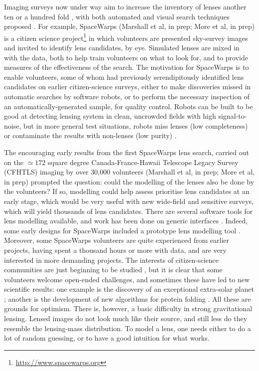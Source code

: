 \documentclass[usenatbib]{mn2e}
\newcommand{\sw}{SpaceWarps\xspace}
\begin{document}
Imaging surveys now under way aim to increase the inventory of lenses
another ten or a hundred fold \citep[see
e.g.][]{Marshall2005,OguriMarshall2010}, with both automated and
visual search techniques proposed
\citep[e.g.][]{Marshall2009,More2012ApJ,Gavazzi2014}. For example, \sw
(Marshall et al, in prep; More et al, in prep) is a citizen science
project\footnote{\url{http://www.spacewarps.org}} in which volunteers
are presented sky-survey images and invited to identify lens
candidates, by eye.  Simulated lenses are mixed in with the data,
both to help train volunteers on what to look for, and to provide
measures of the effectiveness of the search.  The motivation for \sw
is to enable volunteers, some of whom had previously serendipitously
identified lens candidates on earlier citizen-science surveys,
either to make discoveries missed in automatic searches by
software robots, or to perform the necessary inspection of an
automatically-generated sample, for quality control.  Robots can be
built to be good at detecting lensing system in clean, uncrowded fields
with high signal-to-noise, but in more general test situations, robots
miss lenses (low completeness) or contaminate the results with
non-lenses (low purity) \citep{Marshall2009}.

The encouraging early results from the first \sw lens search,
carried out on the  $\simeq172$ square degree Canada-France-Hawaii
Telescope Legacy Survey (CFHTLS) imaging by over 30,000 volunteers
(Marshall et al, in prep; More et al, in prep) prompted the question:
could the modelling of the lenses also be done by the volunteers?  If
so, modelling could help assess prioritise lens candidates at an early
stage, which would be very useful with new wide-field and sensitive
surveys, which will yield thousands of lens candidates. There are
several software tools for lens modelling available, and work has
been done on generic interfaces \citep[e.g.][]{2014A&C.....5...28L}.
Indeed, some early designs for \sw included a prototype lens modelling
tool \citep{2010AAS...21543527N}. Moreover, some \sw volunteers are
quite experienced from earlier projects, having spent a thousand hours
or more with data, and are very interested in more demanding
projects.  The interests of citizen-science communities are just
beginning to be studied \citep[e.g.,][]{2013AEdRv..12a0106J}, but it
is clear that some volunteers welcome open-ended challenges, and
sometimes these have led to new scientific results: one example is the
discovery of an exceptional extra-solar planet
\citep{2013ApJ...768..127S}; another is the development of new
algorithms for protein folding \citep{Khatib22112011}.  All these are
grounds for optimism.  There is, however, a basic difficulty in strong
gravitational lensing. Lensed images do not look much like their
source, and still less do they resemble the lensing-mass
distribution.  To model a lens, one needs either to do a lot of random
guessing, or to have a good intuition for what works.
\end{document}
